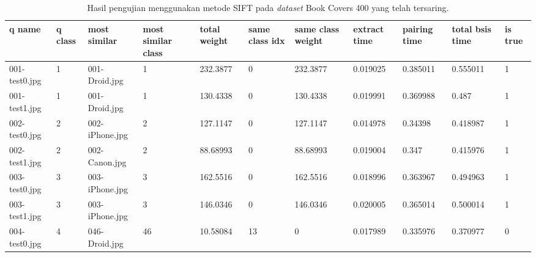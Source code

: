 \begin{landscape}
\begin{longtable}{|p{2cm}|p{1cm}|p{2cm}|p{1cm}|p{2cm}|p{1cm}|p{2cm}|p{2cm}|p{2cm}|p{2cm}|p{1cm}|}
	\caption{Hasil pengujian menggunakan metode SIFT pada \textit{dataset} Book Covers 400 yang telah tersaring.} \\
	\hline
	\textbf{q name} & \textbf{q class} & \textbf{most similar} & \textbf{most similar class} & \textbf{total weight} & \textbf{same class idx} & \textbf{same class weight} & \textbf{extract time} & \textbf{pairing time} & \textbf{total bsis time} & \textbf{is true} \\ \hline
	001-test0.jpg   & 1                & 001-Droid.jpg         & 1                           & 232.3877              & 0                       & 232.3877                   & 0.019025              & 0.385011              & 0.555011                 & 1                \\ \hline
	001-test1.jpg   & 1                & 001-Droid.jpg         & 1                           & 130.4338              & 0                       & 130.4338                   & 0.019991              & 0.369988              & 0.487                    & 1                \\ \hline
	002-test0.jpg   & 2                & 002-iPhone.jpg        & 2                           & 127.1147              & 0                       & 127.1147                   & 0.014978              & 0.34398               & 0.418987                 & 1                \\ \hline
	002-test1.jpg   & 2                & 002-Canon.jpg         & 2                           & 88.68993              & 0                       & 88.68993                   & 0.019004              & 0.347                 & 0.415976                 & 1                \\ \hline
	003-test0.jpg   & 3                & 003-iPhone.jpg        & 3                           & 162.5516              & 0                       & 162.5516                   & 0.018996              & 0.363967              & 0.494963                 & 1                \\ \hline
	003-test1.jpg   & 3                & 003-iPhone.jpg        & 3                           & 146.0346              & 0                       & 146.0346                   & 0.020005              & 0.365014              & 0.500014                 & 1                \\ \hline
	004-test0.jpg   & 4                & 046-Droid.jpg         & 46                          & 10.58084              & 13                      & 0                          & 0.017989              & 0.335976              & 0.370977                 & 0                \\ \hline

\end{longtable}
\end{landscape}
